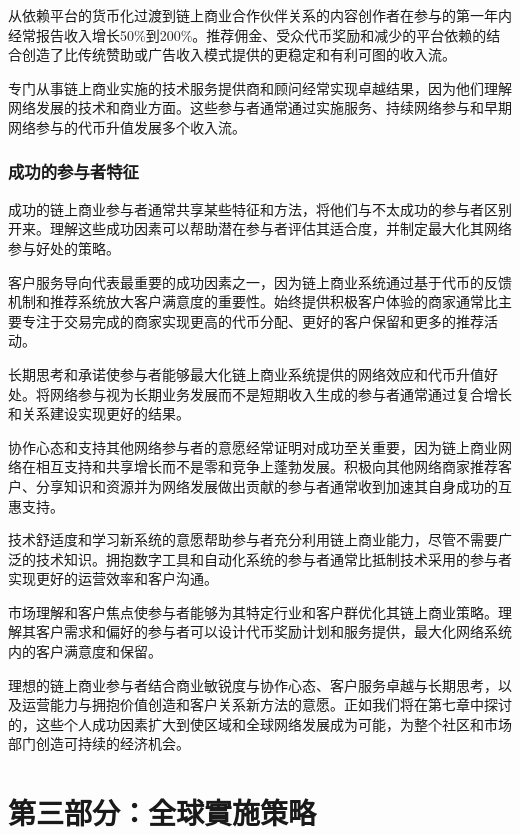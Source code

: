\documentclass[
  Letterpaper,
]{scrbook}
\begin{document}
从依赖平台的货币化过渡到链上商业合作伙伴关系的内容创作者在参与的第一年内经常报告收入增长50\%到200\%。推荐佣金、受众代币奖励和减少的平台依赖的结合创造了比传统赞助或广告收入模式提供的更稳定和有利可图的收入流。

专门从事链上商业实施的技术服务提供商和顾问经常实现卓越结果，因为他们理解网络发展的技术和商业方面。这些参与者通常通过实施服务、持续网络参与和早期网络参与的代币升值发展多个收入流。

\section{成功的参与者特征}\label{ux6210ux529fux7684ux53c2ux4e0eux8005ux7279ux5f81}

成功的链上商业参与者通常共享某些特征和方法，将他们与不太成功的参与者区别开来。理解这些成功因素可以帮助潜在参与者评估其适合度，并制定最大化其网络参与好处的策略。

客户服务导向代表最重要的成功因素之一，因为链上商业系统通过基于代币的反馈机制和推荐系统放大客户满意度的重要性。始终提供积极客户体验的商家通常比主要专注于交易完成的商家实现更高的代币分配、更好的客户保留和更多的推荐活动。

长期思考和承诺使参与者能够最大化链上商业系统提供的网络效应和代币升值好处。将网络参与视为长期业务发展而不是短期收入生成的参与者通常通过复合增长和关系建设实现更好的结果。

协作心态和支持其他网络参与者的意愿经常证明对成功至关重要，因为链上商业网络在相互支持和共享增长而不是零和竞争上蓬勃发展。积极向其他网络商家推荐客户、分享知识和资源并为网络发展做出贡献的参与者通常收到加速其自身成功的互惠支持。

技术舒适度和学习新系统的意愿帮助参与者充分利用链上商业能力，尽管不需要广泛的技术知识。拥抱数字工具和自动化系统的参与者通常比抵制技术采用的参与者实现更好的运营效率和客户沟通。

市场理解和客户焦点使参与者能够为其特定行业和客户群优化其链上商业策略。理解其客户需求和偏好的参与者可以设计代币奖励计划和服务提供，最大化网络系统内的客户满意度和保留。

理想的链上商业参与者结合商业敏锐度与协作心态、客户服务卓越与长期思考，以及运营能力与拥抱价值创造和客户关系新方法的意愿。正如我们将在第七章中探讨的，这些个人成功因素扩大到使区域和全球网络发展成为可能，为整个社区和市场部门创造可持续的经济机会。

\part{第三部分：全球實施策略}
\end{document}
